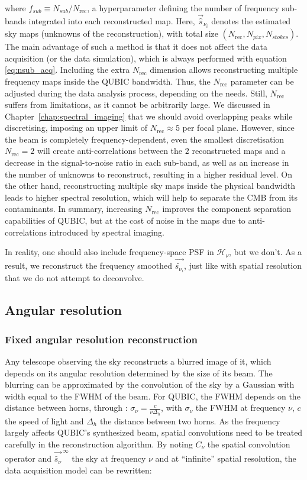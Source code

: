\documentclass[../../thesis.tex]{subfiles}
\begin{document}
where $f_{sub} \equiv N_{sub} / N_\text{rec}$, a hyperparameter defining the number of frequency sub-bands integrated into each reconstructed map. Here, $\vec{\hat{s}}_{\nu_i}$ denotes the estimated sky maps (unknowns of the reconstruction), with total size $\left(N_\text{rec}, N_{pix}, N_{stokes}\right)$. 
The main advantage of such a method is that it does not affect the data acquisition (or the data simulation), which is always performed with equation \ref{eq:nsub_acq}. Including the extra $N_\text{rec}$ dimension allows reconstructing multiple frequency maps inside the QUBIC bandwidth. Thus, the $N_\text{rec}$ parameter can be adjusted during the data analysis process, depending on the needs. Still, $N_\text{rec}$ suffers from limitations, as it cannot be arbitrarily large. We discussed in Chapter~\ref{chap:spectral_imaging} that we should avoid overlapping peaks while discretising, imposing an upper limit of $N_\text{rec} \approx 5$ per focal plane. However, since the beam is completely frequency-dependent, even the smallest discretisation $N_\text{rec}=2$ will create anti-correlations between the $2$ reconstructed maps and a decrease in the signal-to-noise ratio in each sub-band, as well as an increase in the number of unknowns to reconstruct, resulting in a higher residual level. On the other hand, reconstructing multiple sky maps inside the physical bandwidth leads to higher spectral resolution, which will help to separate the CMB from its contaminants.
In summary, increasing $N_\text{rec}$ improves the component separation capabilities of QUBIC, but at the cost of noise in the maps due to anti-correlations introduced by spectral imaging. 

In reality, one should also include frequency-space PSF in $\mathcal{H}_\nu$, but we don't. As a result, we reconstruct the frequency smoothed $\vec{\tilde{s_{\nu_i}}}$, just like with spatial resolution that we do not attempt to deconvolve.

\subsection{Angular resolution} \label{sub:fmm_convolution}

\subsubsection{Fixed angular resolution reconstruction}

Any telescope observing the sky reconstructs a blurred image of it, which depends on its angular resolution determined by the size of its beam. The blurring can be approximated by the convolution of the sky by a Gaussian with width equal to the FWHM of the beam. For QUBIC, the FWHM depends on the distance between horns, through : $\sigma_\nu = \frac{c}{\nu\Delta_h}$, with $\sigma_\nu$ the FWHM at frequency $\nu$, $c$ the speed of light and $\Delta_h$ the distance between two horns. As the frequency largely affects QUBIC's synthesized beam, spatial convolutions need to be treated carefully in the reconstruction algorithm. By noting $C_\nu$ the spatial convolution operator and $\vec{\tilde{s_\nu}}^{~\infty}$ the sky at frequency $\nu$ and at \enquote{infinite} spatial resolution, the data acquisition model can be rewritten:
\end{document}
